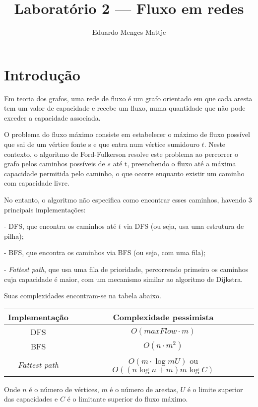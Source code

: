 \documentclass[11pt]{article}
\title{Laboratório 2 — Fluxo em redes}
\author{Eduardo Menges Mattje}
\begin{document}
\maketitle

\section{Introdução}

Em teoria dos grafos, uma rede de fluxo é um grafo orientado em que cada aresta tem um valor de capacidade e recebe um fluxo, numa quantidade que não pode exceder a capacidade associada.

O problema do fluxo máximo consiste em estabelecer o máximo de fluxo possível que sai de um vértice fonte s e que entra num vértice sumidouro $t$. Neste contexto, o algoritmo de Ford-Fulkerson resolve este problema ao percorrer o grafo pelos caminhos possíveis de $s$ até t, preenchendo o fluxo até a máxima capacidade permitida pelo caminho, o que ocorre enquanto existir um caminho com capacidade livre.

No entanto, o algoritmo não especifica como encontrar esses caminhos, havendo 3 principais implementações:

- DFS, que encontra os caminhos até $t$ via DFS (ou seja, usa uma estrutura de pilha);

- BFS, que encontra os caminhos via BFS (ou seja, com uma fila);

- \textit{Fattest path}, que usa uma fila de prioridade, percorrendo primeiro os caminhos cuja capacidade é maior, com um mecanismo similar ao algoritmo de Dijkstra.

 Suas complexidades encontram-se na tabela abaixo.
 
\begin{center}
\begin{tabular}{c|c}
\hline
Implementação & Complexidade pessimista \\
\hline 
DFS & $O(maxFlow \cdot m)$ \\
BFS & $O(n \cdot m^2)$ \\
\textit{Fattest path} & $O(m \cdot \log mU)$ ou $O((n \log n + m)m \log C)$ \\
\hline
\end{tabular}
\end{center}

Onde $n$ é o número de vértices, $m$ é o número de arestas, $U$ é o limite superior das capacidades e $C$ é o limitante superior do fluxo máximo.
\end{document}
